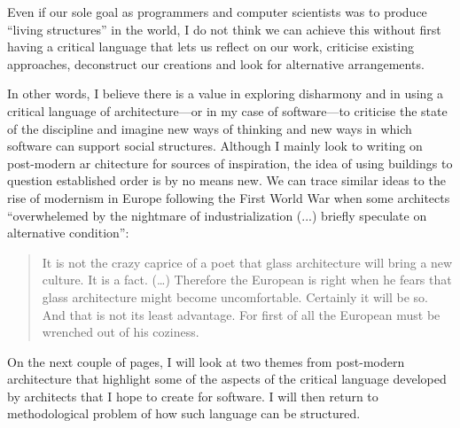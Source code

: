 Even if our sole goal as programmers and computer scientists was to produce ``living
structures'' in the world, I do not think we can achieve this without first having a critical
language that lets us reflect on our work, criticise existing approaches, deconstruct our creations
and look for alternative arrangements.

In other words, I believe there is a value in exploring disharmony
and in using a critical language of architecture---or in my case of software---to
criticise the state of the discipline and imagine new ways of thinking and new ways in which
software can support social structures. Although I mainly look to writing on post-modern ar
chitecture for sources of inspiration, the idea of using buildings to question established order
is by no means new. We can trace similar ideas to the rise of modernism in Europe following
the First World War when some architects ``overwhelemed by the nightmare of industrialization
(...) briefly speculate on alternative condition'':

\begin{quote}
It is not the crazy caprice of a poet that glass architecture will bring a new culture.
It is a fact. (\ldots) Therefore the European is right when he fears that glass architecture
might become uncomfortable. Certainly it will be so. And that is not its least advantage.
For first of all the European must be wrenched out of his coziness.
\end{quote}

On the next couple of pages, I will look at two themes from post-modern architecture that
highlight some of the aspects of the critical language developed by architects that I hope
to create for software. I will then return to methodological problem of how such language
can be structured.



